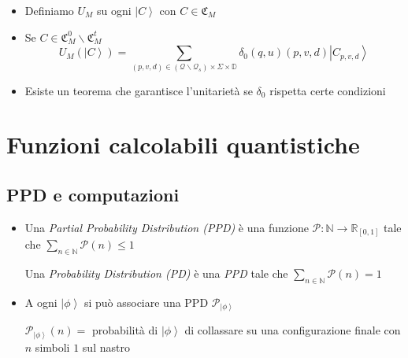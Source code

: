 \documentclass{beamer}
\begin{document}
\begin{frame}{\subsecname}{}
	\begin{itemize}
		\item Definiamo \( U_{M} \) su ogni \(\left | C \right \rangle \) con \( C \in \mathfrak{C}_M \)
		\item Se \( C \in \mathfrak{C}^{0}_M \backslash \mathfrak{C}^{t}_M \)
		\[ U_{M} \left ( \left | C \right \rangle \right ) =
		\sum_{\left (p,v,d \right ) \in \left ( \mathcal{Q} \backslash \mathcal{Q}_{s} \right ) \times \Sigma \times \mathbb{D}}
		\delta_{0}(q, u)(p, v, d) \left | C_{p,v,d} \right \rangle \]
		\item Esiste un teorema che garantisce l'unitarietà se \(\delta_{0}\) rispetta certe condizioni
	\end{itemize}
\end{frame}

\section{Funzioni calcolabili quantistiche}

\subsection{PPD e computazioni}

\begin{frame}{\secname}{\subsecname}
	\begin{itemize}
		\item Una \textit{Partial Probability Distribution (PPD)} è una funzione \( \mathcal{P} : \mathbb{N} \rightarrow \mathbb{R}_{[0,1]} \) tale che \( \sum_{n \in \mathbb{N}} \mathcal{P} \left ( n \right ) \le 1 \)\par
		Una \textit{Probability Distribution (PD)} è una \textit{PPD} tale che \( \sum_{n \in \mathbb{N}} \mathcal{P} \left ( n \right ) = 1 \)
		\item A ogni \( \left | \phi \right \rangle \) si può associare una PPD \( \mathcal{P}_{\left | \phi \right \rangle} \)\par
		\( \mathcal{P}_{\left | \phi \right \rangle} \left ( n \right ) = \) probabilità di \( \left | \phi \right \rangle \) di collassare su una configurazione finale con \(n\) simboli \(1\) sul nastro 
	\end{itemize}
\end{frame}
\end{document}
